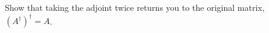 \begin{exercise}
Show that taking the adjoint twice returns you to the original matrix, $(A^\dag)^\dag = A$.
\end{exercise}






